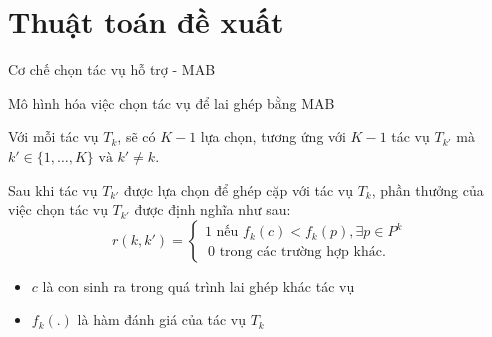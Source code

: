 \section{Thuật toán đề xuất}

\begin{frame}{Cơ chế chọn tác vụ hỗ trợ - MAB}
    \begin{alertblock}{Mô hình hóa việc chọn tác vụ để lai ghép bằng MAB}
        \begin{mydef}
            Với mỗi tác vụ $T_k$, sẽ có $K-1$ lựa chọn, tương ứng với $K-1$ tác vụ $T_{k'}$ mà $k' \in \{1, \ldots, K\} \text{ và } k' \ne k$.
            \label{def:propose:action}
        \end{mydef}

        \begin{mydef}
            Sau khi tác vụ $T_{k'}$ được lựa chọn để ghép cặp với tác vụ $T_{k}$, phần thưởng của việc chọn tác vụ $T_{k'}$ được định nghĩa như sau:
            \begin{equation}
                r(k, k') = \left\{
                    \begin{array}{ll}
                        1 \text{ nếu } f_k(c) < f_k(p) , \exists p \in P^k \\\
                        0 \text{ trong các trường hợp khác}.
                    \end{array}
                  \right.
            \end{equation}
            \begin{itemize}
                \item $c$ là con sinh ra trong quá trình lai ghép khác tác vụ
                \item $f_k(.)$ là hàm đánh giá của tác vụ $T_k$
            \end{itemize}
            \label{def:propose:reward}
        \end{mydef}
    \end{alertblock}
\end{frame}


